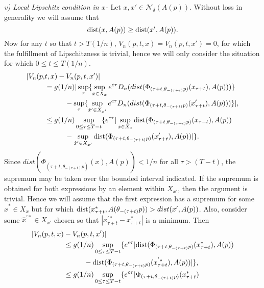 \begin{prf}
  {\em v) Local Lipschitz condition in $x$-} Let $x,  x' \in
  \mathcal{N}_{\delta}(A(p))$. Without loss in generality we will
  assume that
  \[ {\rm dist}(x, A(p)) \geq {\rm dist}(x', A(p)). \]
  Now for any $t$ so that
  $t > T(1/n)$, $V_n(p, t, x) = V_n(p, t, x') = 0$, for which the fulfillment
  of Lipschitzness is trivial, hence we will only consider the situation for
  which $0 \leq t \leq T(1/n)$.
  \begin{align*}
  |V_n(p, &t, x) - V_n( p, t, x')| \\
    & = g(1/n) | \sup_{\tau} \{ \sup_{\hat{x} \in
      X_x} e^{c\tau} D_n(dist(\Phi_{(\tau+t, \theta_{-(\tau+t)} p)}(x_{\tau+t}),
      A(p)))\} \\
    & \hspace{1cm} - \sup_{\tau} \{ \sup_{\hat{x}' \in X_{x'}} e^{c\tau}
      D_n(dist(\Phi_{(\tau+t, \theta_{-(\tau+t)} p)}(x'_{\tau+t}), A(p))) \} |, \\
    &\leq g(1/n) \sup_{0 \leq \tau \leq T - t} \{ e^{c\tau} |  \sup_{\hat{x} \in
       X_x} {\rm dist}(\Phi_{(\tau+t, \theta_{-(\tau+t)} p)}(x_{\tau+t}),A(p)) \\
       & \hspace{1cm} - \sup_{\hat{x}' \in X_{x'}} {\rm dist}(\Phi_{(\tau+t,
      \theta_{-(\tau+t)} p)}(x'_{\tau+t}),A(p)) |  \}. \\
  \end{align*}
  Since $dist(\Phi_{(\tau+t, \theta_{-(\tau+t)} p)}(x),
  A(p)) < 1/n $  for all $\tau > (T - t)$, the supremum may
  be taken over the bounded interval indicated. If the supremum is obtained for
  both expressions by an element within $X_{x'}$, then the argument is trivial.
  Hence we will assume that the first expression has a supremum for some
  $\hat{x}^* \in X_x$ but for which ${\rm dist}(x^*_{\tau + t}, A(\theta_{-(\tau +
  t)} p)) > dist( x', A(p))$. Also, consider some $\hat{x}^{'*} \in X_{x'}$
  chosen so that $|x^{'*}_{\tau + t} - x^*_{\tau + t}|$ is a minimum. Then
  \begin{align*}
  |V_n(p, t, x) &- V_n( p, t, x')| \\
    &\leq g(1/n) \sup_{0 \leq \tau \leq T-t} \{ e^{c\tau} |
      \dist(\Phi_{(\tau+t, \theta_{-(\tau+t)} p)}(x^*_{\tau+t}),A(p)) \\
    & \hspace{1cm} - \dist(\Phi_{(\tau+t, \theta_{-(\tau+t)} p)}
      (x^{'*}_{\tau+t}),A(p)) | \}, \\
    &\leq g(1/n) \sup_{0 \leq \tau \leq T-t} \{ e^{c\tau} | \Phi_{(\tau+t, \theta_{-(\tau+t)}
      p)}(x^*_{\tau+t}) \\

\end{align*}
\end{prf}
